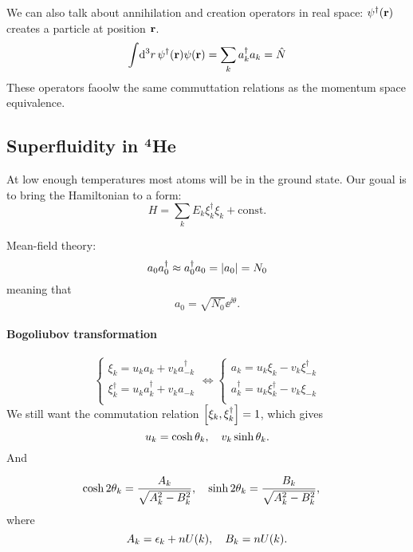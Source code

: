 \documentclass[11pt,letter, swedish, english, twocolumn
]{article}
\begin{document}
We can also talk about annihilation and creation operators in real
space: $\psi^\dagger(\vb{r})$ creates a particle at position $\vb{r}$.
\begin{equation}
\int\!\rd^3r\, \psi^\dagger(\vb{r})\psi(\vb{r})=\sum_ka_k^\dagger a_k=\hat{N}
\end{equation}
These operators faoolw the same commuttation relations as the momentum
space equivalence. 


\subsection{Superfluidity in $\mathbf{^4}$He}
At low enough temperatures most atoms will be in the ground state. 
Our goual is to bring the Hamiltonian to a form:
\begin{equation}
H=\sum_k E_k \xi_k^\dagger\xi_k+\text{const.}
\end{equation}

Mean-field theory:
\begin{equation}
a_0a_0^\dagger \approx a_0^\dagger a_0 = \abs{a_0}= N_0
\end{equation}
meaning that
\begin{equation}
a_0=\sqrt{N_0} \ee^{\ii\theta}.
\end{equation}

\paragraph{Bogoliubov transformation}
\begin{equation}
\begin{cases}
\xi_k=u_k a_k+v_ka_{-k}^\dagger\\
\xi_k^\dagger=u_k a_k^\dagger+v_ka_{-k}\\
\end{cases}
\Leftrightarrow
\begin{cases}
a_k=u_k\xi_k-v_k\xi_{-k}^\dagger\\
a_k^\dagger=u_k\xi_k^\dagger-v_k\xi_{-k}\\
\end{cases}
\end{equation}
We still want the commutation relation
$\comm{\xi_k}{\xi_k^\dagger}=1$, which gives
\begin{equation}
u_k=\cosh\theta_k\qcomma
v_k\sinh\theta_k.
\end{equation}
And

\begin{equation}
\cosh2\theta_k=\frac{A_k}{\sqrt{A_k^2-B_k^2}}\qcomma
\sinh2\theta_k=\frac{B_k}{\sqrt{A_k^2-B_k^2}}\qcomma
\end{equation}
where
\begin{equation}
A_k=\epsilon_k+nU(k)\qcomma
B_k=nU(k).
\end{equation}
\end{document}
